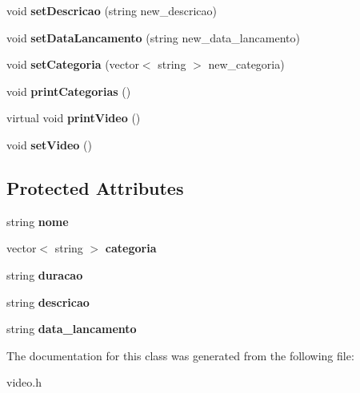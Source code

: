 \begin{DoxyCompactItemize}
\item 
void {\bfseries set\+Descricao} (string new\+\_\+descricao)\hypertarget{classVideo_a133d51a6d192c248c1013bdd81508bcb}{}\label{classVideo_a133d51a6d192c248c1013bdd81508bcb}

\item 
void {\bfseries set\+Data\+Lancamento} (string new\+\_\+data\+\_\+lancamento)\hypertarget{classVideo_aad4e9417ebbb6c8418a3a3769f4ff7a8}{}\label{classVideo_aad4e9417ebbb6c8418a3a3769f4ff7a8}

\item 
void {\bfseries set\+Categoria} (vector$<$ string $>$ new\+\_\+categoria)\hypertarget{classVideo_acfd3e3947d7ffabef36eb18cf4049a48}{}\label{classVideo_acfd3e3947d7ffabef36eb18cf4049a48}

\item 
void {\bfseries print\+Categorias} ()\hypertarget{classVideo_ad95dd3840a6818ecd144b882b4fd0902}{}\label{classVideo_ad95dd3840a6818ecd144b882b4fd0902}

\item 
virtual void {\bfseries print\+Video} ()\hypertarget{classVideo_affd6d79b2807e62a9ed3cf343541edd0}{}\label{classVideo_affd6d79b2807e62a9ed3cf343541edd0}

\item 
void {\bfseries set\+Video} ()\hypertarget{classVideo_a2fa6c3ed5a0b51930cddf12707b537ac}{}\label{classVideo_a2fa6c3ed5a0b51930cddf12707b537ac}

\end{DoxyCompactItemize}
\subsection*{Protected Attributes}
\begin{DoxyCompactItemize}
\item 
string {\bfseries nome}\hypertarget{classVideo_a6b49d73a9ec7d7b99ef5c809f94514ca}{}\label{classVideo_a6b49d73a9ec7d7b99ef5c809f94514ca}

\item 
vector$<$ string $>$ {\bfseries categoria}\hypertarget{classVideo_a8ff58ab1ddf14d474ea7174b13ed05b4}{}\label{classVideo_a8ff58ab1ddf14d474ea7174b13ed05b4}

\item 
string {\bfseries duracao}\hypertarget{classVideo_a1dec1f3fc1f160b6ae4210bdeca1eaf0}{}\label{classVideo_a1dec1f3fc1f160b6ae4210bdeca1eaf0}

\item 
string {\bfseries descricao}\hypertarget{classVideo_a4bf01d0dcbd8ac417c65755fe1a60f2d}{}\label{classVideo_a4bf01d0dcbd8ac417c65755fe1a60f2d}

\item 
string {\bfseries data\+\_\+lancamento}\hypertarget{classVideo_a90f3f4e7d9564a225445acc6248f15d9}{}\label{classVideo_a90f3f4e7d9564a225445acc6248f15d9}

\end{DoxyCompactItemize}


The documentation for this class was generated from the following file\+:\begin{DoxyCompactItemize}
\item 
video.\+h\end{DoxyCompactItemize}

